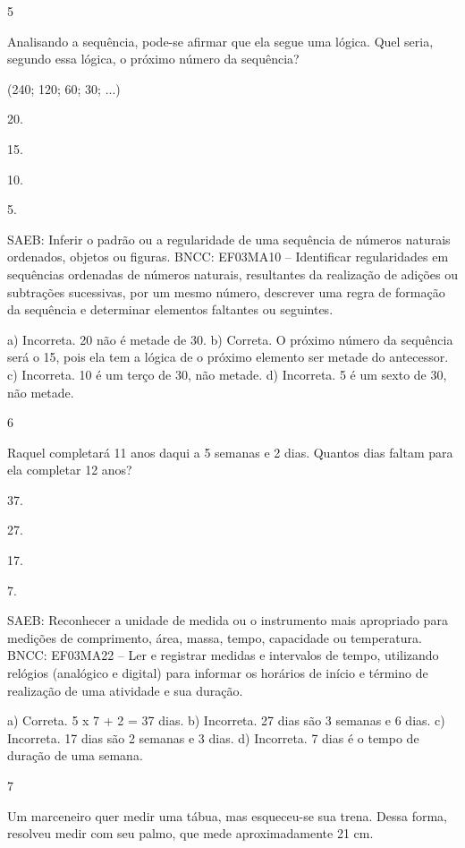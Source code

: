 {\begin{escolha}
{\num{5}

Analisando a sequência, pode-se afirmar que ela segue uma lógica. Quel seria, segundo essa lógica, o próximo número da sequência?

(240; 120; 60; 30; ...)

\begin{escolha}
\item
  20.
\item
  15.
\item
  10.
\item
  5.
\end{escolha}

SAEB: Inferir o padrão ou a regularidade de uma sequência de números naturais ordenados, objetos ou figuras.
BNCC: EF03MA10 -- Identificar regularidades em sequências ordenadas de números naturais,
resultantes da realização de adições ou subtrações sucessivas, por um mesmo número,
descrever uma regra de formação da sequência e determinar elementos faltantes ou seguintes.

a) Incorreta. 20 não é metade de 30.
b) Correta. O próximo número da sequência será o 15, pois ela tem a lógica de o próximo
elemento ser metade do antecessor.
c) Incorreta. 10 é um terço de 30, não metade.
d) Incorreta. 5 é um sexto de 30, não metade.

\num{6}

Raquel completará 11 anos daqui a 5 semanas e 2 dias. Quantos dias faltam para ela completar 12 anos?

\begin{escolha}
\item
  37.
\item
  27.
\item
  17.
\item
  7.
\end{escolha}

SAEB: Reconhecer a unidade de medida ou o instrumento mais apropriado para medições de comprimento, área, massa, tempo, capacidade
ou temperatura.
BNCC: EF03MA22 -- Ler e registrar medidas e intervalos de tempo, utilizando relógios (analógico e
digital) para informar os horários de início e término de realização de uma atividade e sua
duração.

a) Correta. 5 x 7 + 2 = 37 dias.
b) Incorreta. 27 dias são 3 semanas e 6 dias.
c) Incorreta. 17 dias são 2 semanas e 3 dias.
d) Incorreta. 7 dias é o tempo de duração de uma semana.

\num{7}

Um marceneiro quer medir uma tábua, mas esqueceu-se sua trena. Dessa forma, resolveu medir com seu palmo, que mede aproximadamente 21 cm.

}
\end{escolha}}
